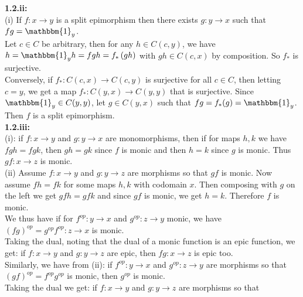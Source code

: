 \documentclass[a4paper]{article}
\begin{document}
    \textbf{1.2.ii:} \\
    (i) If $f  \colon x \to y$ is a split epimorphism then
    there exists $g  \colon y \to x$ such that $fg = \mathbbm{1}_{y}$.\\
    Let $c \in C$ be arbitrary, then for any
    $h \in C(c,y)$, we have
    $h = \mathbbm{1}_y h = fg h = f_* \left( gh \right) $ with $gh \in C(c,x)$
    by
    composition. So $f_*$ is surjective.\\
    \linebreak
    Conversely, if $f_*  \colon C(c,x) \to C(c,y)$ is surjective for
    all $c \in C$, then
    letting $c = y$, we get a map $f_*  \colon C(y,x) \to C(y,y)$ that is
    surjective. Since  $\mathbbm{1}_y \in C(y,y)$, let $
    g \in C(y,x)$ such that $fg = f_* (g) = \mathbbm{1}_y$. Then
    $f$ is a split epimorphism.\\
    \linebreak
    \textbf{1.2.iii:} \\
    (i): if  $f \colon x \to y$ and $g  \colon y\to x$ are monomorphisms, then
    if for maps $h,k$ we have
    $fg h = fg k$, then $gh = gk$ since $f$ is monic and then
    $h = k$ since $g$ is monic. Thus $gf  \colon x \to z$ is
    monic.\\
    \linebreak
    (ii) Assume $f  \colon x \to y$ and $g  \colon y \to z$ are morphisms so
    that
    $gf$ is monic. Now assume
    $fh = fk$ for some maps $h,k$ with codomain $x$. Then
    composing with $g$ on the left we get
    $gf h = gfk$ and since $gf$ is monic, we get $h =  k$. Therefore
    $f$ is monic.\\
    \linebreak
    We thus have
    if for  $f^{op}  \colon y \to x$ and $g^{op}  \colon z\to y$ monic, we have
    $\left( fg \right)^{op} = g^{op} f^{op}  \colon z \to x$ is
    monic.\\
    Taking the dual, noting that the dual of a monic function is an epic
    function, we get:
    if $f  \colon x \to y$ and $g  \colon y \to z$ are epic, then
    $fg  \colon x \to z$ is epic too.\\
    \linebreak
    Similarly, we have from (ii):
    if $f^{op}  \colon y\to x$ and $g^{op}  \colon z \to y$ are morphisms so
    that
    $\left( gf \right)^{op} =f^{op}g^{op}$ is monic, then
    $g^{op}$ is monic.\\
    \linebreak
    Taking the dual we get:
    if $f \colon x \to y$ and $g  \colon y \to z$ are morphisms so that
\end{document}
